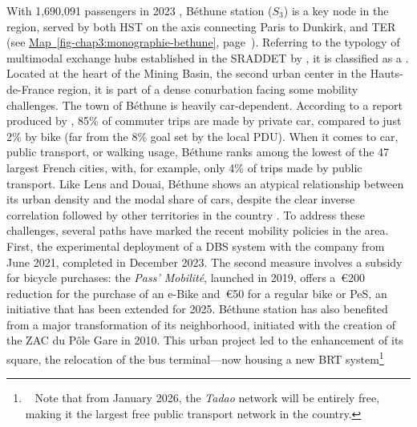 \begin{refsegment}
With 1,690,091 passengers in 2023 \textcolor{blue}{\autocite{sncf_frequentation_2024}}, Béthune station (\(S_3\)) is a key node in the region, served by both \acrshort{HST} on the axis connecting Paris to Dunkirk, and \acrshort{TER} (see \hyperref[fig-chap3:monographie-bethune]{Map~\ref{fig-chap3:monographie-bethune}}, page~\pageref{fig-chap3:monographie-bethune}). Referring to the typology of multimodal exchange hubs established in the \acrshort{SRADDET} by \textcolor{blue}{\textcite[81]{region_hauts-de-france_sraddet_2024}}, it is classified as a . Located at the heart of the Mining Basin, the second urban center in the Hauts-de-France region, it is part of a dense conurbation facing some mobility challenges. The town of Béthune is heavily car-dependent. According to a report produced by \textcolor{blue}{\textcite[12, 15, 19]{fnaut_deplacements_2022}}, 85\% of commuter trips are made by private car, compared to just 2\% by bike (far from the 8\% goal set by the local \acrshort{PDU}). When it comes to car, public transport, or walking usage, Béthune ranks among the lowest of the 47 largest French cities, with, for example, only 4\% of trips made by public transport. Like Lens and Douai, Béthune shows an atypical relationship between its urban density and the modal share of cars, despite the clear inverse correlation followed by other territories in the country \textcolor{blue}{\autocite[45]{fnaut_deplacements_2022}}. To address these challenges, several paths have marked the recent mobility policies in the area. First, the experimental deployment of a \acrshort{DBS} system with the company  from June 2021, completed in December 2023. The second measure involves a subsidy for bicycle purchases: the \textsl{Pass' Mobilité}, launched in 2019, offers a~\euro200 reduction for the purchase of an \acrshort{e-Bike} and~\euro50 for a regular bike or \acrshort{PeS}, an initiative that has been extended for 2025. Béthune station has also benefited from a major transformation of its neighborhood, initiated with the creation of the \acrfull{ZAC} du Pôle Gare in 2010. This urban project led to the enhancement of its square, the relocation of the bus terminal—now housing a new \acrshort{BRT} system\footnote{~
    Note that from January 2026, the \textsl{Tadao} network will be entirely free, making it the largest free public transport network in the country.
}
\end{refsegment}
